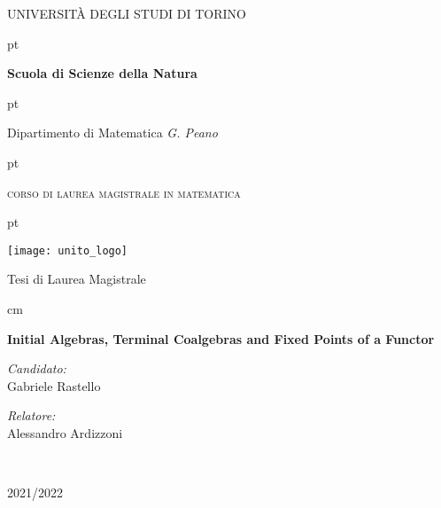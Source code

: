 \documentclass[letterpaper]{memoir}
\begin{document}
\pagestyle{empty}

\begin{center}
  \centerline{\huge{\textsc{\MakeUppercase{Università degli Studi di Torino}}}}
   pt

  \centerline{\huge{\textbf{Scuola di Scienze della Natura}}}

   pt

  \centerline{\LARGE{Dipartimento di Matematica \textit{G. Peano}}}

   pt

  \centerline{\huge{\textsc{corso di laurea magistrale in matematica}}}

   pt

  \centerline{\texttt{[image: unito\_logo]}}
  \vskip 1.2cm
  \centerline{\Large {Tesi di Laurea Magistrale}}

   cm
         {\huge \bfseries Initial Algebras, Terminal Coalgebras and Fixed Points of a Functor\par} \vspace{0.4cm} %
         \vskip 1.5cm

         \begin{minipage}[t]{0.4\textwidth}
           \begin{flushleft} \large
             \emph{Candidato:}\\
                  {Gabriele Rastello} %
           \end{flushleft}
         \end{minipage}
         \begin{minipage}[t]{0.4\textwidth}
           \begin{flushright} \large
             \emph{Relatore:} \\
                  {Alessandro Ardizzoni} %
           \end{flushright}
         \end{minipage}\\

         \vfill

         {\large 2021/2022}\\ %
         
         \vfill
         
\end{center}
\end{document}
